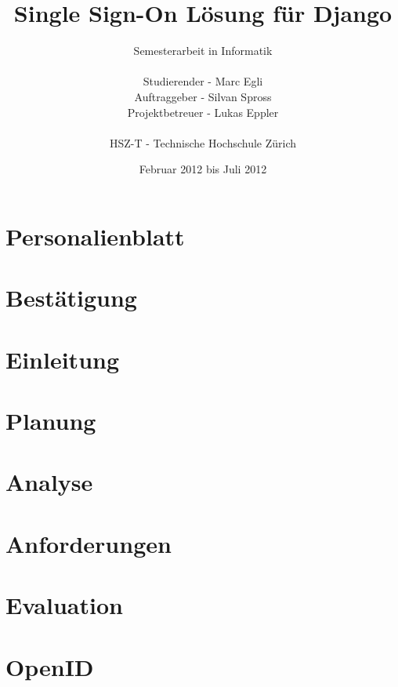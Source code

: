 \documentclass[
11pt, %
a4paper, %
BCOR10mm, %
DIV14, %
footsepline = false, %
headsepline, %
oneside, %
openright,
halfparskip, %
abstracton, %
listof=totocnumbered, %
bibliography=totocnumbered %
]{scrreprt}
\title{Single Sign-On Lösung für Django}
\author{Semesterarbeit in Informatik\\
    \\
    Studierender - Marc Egli\\
	Auftraggeber - Silvan Spross\\
    Projektbetreuer - Lukas Eppler\\
	\\
	HSZ-T - Technische Hochschule Zürich}
\date{Februar 2012 bis Juli 2012}
\begin{document}
  \ifpdf
  \else
  \fi
  
  \maketitle
  

  
  \tableofcontents
  
  \chapter{Personalienblatt}
  
  
  \chapter{Bestätigung}
  
  
  \chapter{Einleitung}
  \label{cha:Einleitung}
  

  \chapter{Planung}
  \label{cha:Planung}
  
  
  \chapter{Analyse}
  \label{cha:Analyse}
  
  
  \chapter{Anforderungen}
  \label{cha:Anforderungen}
  
  
  \chapter{Evaluation}
  \label{cha:Evaluation}
  
  
  \chapter{OpenID}
  \label{cha:OpenID}
  
\end{document}
